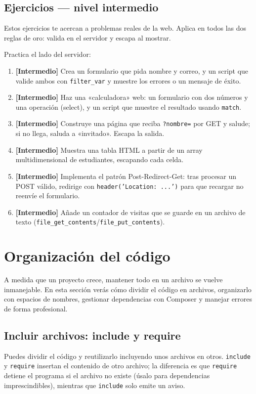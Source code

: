 \documentclass[11pt]{article}
\begin{document}
\subsection{Ejercicios — nivel intermedio}
Estos ejercicios te acercan a problemas reales de la web. Aplica en todos las dos reglas de oro: valida en el servidor y escapa al mostrar.

Practica el lado del servidor:

\begin{enumerate}[leftmargin=1.7em,itemsep=3pt,topsep=2pt]
\item \textbf{[Intermedio]} Crea un formulario que pida nombre y correo, y un script que valide ambos con \texttt{filter\_var} y muestre los errores o un mensaje de éxito.
\item \textbf{[Intermedio]} Haz una «calculadora» web: un formulario con dos números y una operación (select), y un script que muestre el resultado usando \texttt{match}.
\item \textbf{[Intermedio]} Construye una página que reciba \texttt{?\allowbreak{}nombre=\allowbreak{}} por GET y salude; si no llega, saluda a «invitado». Escapa la salida.
\item \textbf{[Intermedio]} Muestra una tabla HTML a partir de un array multidimensional de estudiantes, escapando cada celda.
\item \textbf{[Intermedio]} Implementa el patrón Post-Redirect-Get: tras procesar un POST válido, redirige con \texttt{header('Location:\allowbreak{} .\allowbreak{}.\allowbreak{}.\allowbreak{}')} para que recargar no reenvíe el formulario.
\item \textbf{[Intermedio]} Añade un contador de visitas que se guarde en un archivo de texto (\texttt{file\_get\_contents}/\texttt{file\_put\_contents}).
\end{enumerate}
\section{Organización del código}
A medida que un proyecto crece, mantener todo en un archivo se vuelve inmanejable. En esta sección verás cómo dividir el código en archivos, organizarlo con espacios de nombres, gestionar dependencias con Composer y manejar errores de forma profesional.

\subsection{Incluir archivos: include y require}
Puedes dividir el código y reutilizarlo incluyendo unos archivos en otros. \texttt{include} y \texttt{require} insertan el contenido de otro archivo; la diferencia es que \texttt{require} detiene el programa si el archivo no existe (úsalo para dependencias imprescindibles), mientras que \texttt{include} solo emite un aviso.
\end{document}
